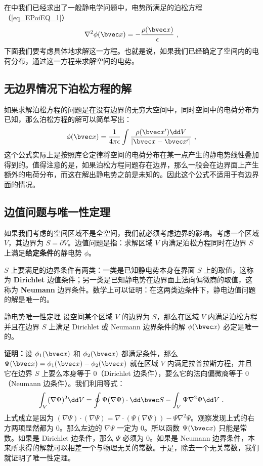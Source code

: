 

在中我们已经求出了一般静电学问题中，电势所满足的泊松方程（\autoref{eq_EPoiEQ_1}）
\begin{align}
\nabla^2 \phi(\bvec x)=-\frac{\rho(\bvec x)}{\epsilon}~,
\end{align}
下面我们要考虑具体地求解这一方程。也就是说，如果我们已经确定了空间内的电荷分布，通过这一方程来求解空间的电势。
\subsection{无边界情况下泊松方程的解}
如果求解泊松方程的问题是在没有边界的无穷大空间中，同时空间中的电荷分布为已知，那么泊松方程的解可以简单写出：
\begin{align}
\phi(\bvec x)=\frac{1}{4\pi \epsilon}\int \frac{\rho (\bvec x')\dd V}{|\bvec x-\bvec x'|}~,
\end{align}
这个公式实际上是按照库仑定律将空间的电荷分布在某一点产生的静电势线性叠加得到的。值得注意的是，如果泊松方程问题存在边界，那么一般会在边界面上产生额外的电荷分布，而这在解出静电势之前是未知的。因此这个公式不适用于有边界面的情况。

\subsection{边值问题与唯一性定理}
如果我们考虑的空间区域不是全空间，我们就必须考虑边界的影响。考虑一个区域 $V$，其边界为 $S=\partial V$。边值问题是指：求解区域 $V$ 内满足泊松方程同时在边界 $S$ 上满足\textbf{给定条件}的静电势 $\phi$。

$S$ 上要满足的边界条件有两类：一类是已知静电势本身在界面 $S$
上的取值，这称为 \textbf{Dirichlet} 边值条件；另一类是已知静电势在边界面上法向偏微商的取值，这称为 \textbf{Neumann} 边界条件。数学上可以证明：在这两类边条件下，静电边值问题的解是唯一的。
\begin{theorem}{静电势唯一性定理}\label{the_empoi_1}
设空间某个区域 $V$ 的边界为 $S$，那么在区域 $V$ 内满足泊松方程并且在边界 $S$ 上满足 Dirichlet 或 Neumann 边界条件的解 $\phi(\bvec x)$ 必定是唯一的。
\end{theorem}
\textbf{证明：}设 $\phi_1(\bvec x)$ 和 $\phi_2(\bvec x)$ 都满足条件，那么 $\Psi(\bvec x)=\phi_1(\bvec x)-\phi_2(\bvec x)$ 就在区域 $V$ 内满足拉普拉斯方程，并且它在边界 $S$ 上要么本身等于 $0$（Dirichlet 边条件），要么它的法向偏微商等于 $0$（Neumann 边条件）。我们利用等式：
\begin{align}
\int_V (\nabla \Psi)^2 \dd V=\oint \Psi(\nabla \Psi)\cdot \dd \bvec S - \int_V \Psi \nabla^2\Psi \dd V~.
\end{align}
上式成立是因为 $(\nabla \Psi)\cdot (\nabla \Psi)=\nabla\cdot (\Psi(\nabla\Psi))-\Psi\nabla^2\Psi$。观察发现上式的右方两项显然都为 $0$。那么左边的 $\nabla\Psi$ 一定为 $0$。所以函数 $\Psi(\bvec x)$ 只能是常数。如果是 Dirichlet 边条件，那么 $\Psi$ 必须为 $0$。如果是 Neumann 边界条件，本来所求得的解就可以相差一个与物理无关的常数。于是，除去一个无关常数，我们就证明了唯一性定理。

